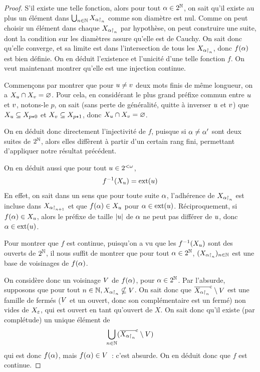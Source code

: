 \begin{proof}
  S'il existe une telle fonction, alors pour tout $\alpha \in 2^{\mathbb N}$, on sait
  qu'il existe au plus un élément dans $\bigcup_{n \in \mathbb N} X_{\alpha\mathbin{\upharpoonright}_{n}}$
  comme son diamètre est nul. Comme on peut choisir un élément dans chaque
  $X_{\alpha\mathbin{\upharpoonright}_{n}}$ par hypothèse, on peut construire une suite, dont la
  condition sur les diamètres assure qu'elle est de Cauchy. On sait donc qu'elle
  converge, et sa limite est dans l'intersection de tous les $X_{\alpha\mathbin{\upharpoonright}_{n}}$,
  donc $f(\alpha)$ est bien définie. On en déduit l'existence et l'unicité
  d'une telle fonction $f$. On veut maintenant montrer qu'elle est une injection
  continue.
  
  Commençons par montrer que pour $u \neq v$ deux mots finis de même
  longueur, on a $X_u \cap X_v = \varnothing$. Pour cela, en considérant le
  plus grand préfixe commun entre $u$ et $v$, notons-le $p$, on sait
  (sans perte de généralité, quitte à inverser $u$ et $v$) que
  $X_u \subseteq X_{p\mathbin{\star} 0}$ et $X_v \subseteq X_{p\mathbin{\star} 1}$, donc
  $X_u\cap X_v =\varnothing$.

  On en déduit donc directement l'injectivité de $f$, puisque si
  $\alpha \neq \alpha'$ sont deux suites de $2^\mathbb N$, alors elles diffèrent à
  partir d'un certain rang fini, permettant d'appliquer notre résultat
  précédent.

  On en déduit aussi que pour tout $u \in 2^{<\omega}$,
  \[f^{-1}(X_u) = \operatorname{ext}(u)\]
  En effet, on sait dans un sens que pour toute suite $\alpha$, l'adhérence de
  $X_{\alpha\mathbin{\upharpoonright}_{n}}$ est incluse dans $X_{\alpha \mathbin{\upharpoonright}_{n + 1}}$ et que
  $f(\alpha) \in X_u$ pour $\alpha \in \operatorname{ext}(u)$. Réciproquement, si
  $f(\alpha) \in X_u$, alors le préfixe de taille $|u|$ de $\alpha$
  ne peut pas différer de $u$, donc $\alpha \in \operatorname{ext}(u)$.

  Pour montrer que $f$ est continue, puisqu'on a vu que les $f^{-1}(X_u)$
  sont des ouverts de $2^\mathbb N$, il nous suffit de montrer que pour tout
  $\alpha \in 2^\mathbb N$, $(X_{\alpha\mathbin{\upharpoonright}_{n}})_{n \in \mathbb N}$ est une base de voisinages
  de $f(\alpha)$.

  On considère donc un voisinage $V$ de $f(\alpha)$, pour
  $\alpha \in 2^\mathbb N$. Par l'absurde, supposons que pour tout
  $n \in\mathbb N, X_{\alpha\mathbin{\upharpoonright}_{n}} \nsubseteq V$. On sait donc que
  $\overline{X_{\alpha\mathbin{\upharpoonright}_{n}}}^{\mathrm c} \setminus V$ est une famille de fermés
  ($V$ et un ouvert, donc son complémentaire est un fermé) non vides de
  $X_{\varepsilon}$, qui est ouvert en tant qu'ouvert de $X$. On sait donc qu'il existe
  (par complétude) un unique élément de
  \[\bigcup_{n \in \mathbb N} (\overline{X_{\alpha\mathbin{\upharpoonright}_{n}}}^{\mathrm c}\setminus V)\]
  qui est donc $f(\alpha)$, mais $f(\alpha) \in V$~: c'est absurde. On
  en déduit donc que $f$ est continue.
\end{proof}

